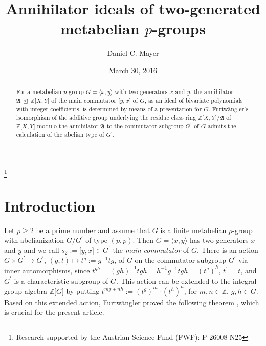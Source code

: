 \documentclass{amsart}
\theoremstyle{definition}
\numberwithin{equation}{section}
\begin{document}
\title{Annihilator ideals of two-generated metabelian \(p\)-groups}

\author{Daniel C. Mayer}
\address{Naglergasse 53\\8010 Graz\\Austria}
\thanks{Research supported by the Austrian Science Fund (FWF): P 26008-N25}


\date{March 30, 2016}


\begin{abstract}
For a metabelian \(p\)-group \(G=\langle x,y\rangle\) with two generators \(x\) and \(y\),
the annihilator \(\mathfrak{A}\,\unlhd\,\mathbb{Z}\lbrack X,Y\rbrack\)
of the main commutator \(\lbrack y,x\rbrack\) of \(G\),
as an ideal of bivariate polynomials with integer coefficients,
is determined by means of a presentation for \(G\).
Furtw\"angler's isomorphism of the additive group underlying the residue class ring
\(\mathbb{Z}\lbrack X,Y\rbrack/\mathfrak{A}\)
of \(\mathbb{Z}\lbrack X,Y\rbrack\) modulo the annihilator \(\mathfrak{A}\)
to the commutator subgroup \(G^\prime\) of \(G\)
admits the calculation of the abelian type of \(G^\prime\).
\end{abstract}

\maketitle



\section{Introduction}
\label{s:Intro}

\noindent
Let \(p\ge 2\) be a prime number
and assume that \(G\) is a finite metabelian \(p\)-group
with abelianization \(G/G^\prime\) of type \((p,p)\).
Then \(G=\langle x,y\rangle\) has two generators \(x\) and \(y\)
and we call \(s_2:=\lbrack y,x\rbrack\in G^\prime\)
the \textit{main commutator} of \(G\).
There is an action \(G\times G^\prime\to G^\prime\),
\((g,t)\mapsto t^g:=g^{-1}tg\),
of \(G\) on the commutator subgroup \(G^\prime\)
via inner automorphisms,
since \(t^{gh}=(gh)^{-1}tgh=h^{-1}g^{-1}tgh=(t^g)^h\), \(t^1=t\),
and \(G^\prime\) is a characteristic subgroup of \(G\).
This action can be extended to the integral group algebra
\(\mathbb{Z}\lbrack G\rbrack\)
by putting \(t^{mg+nh}:=(t^g)^m\cdot (t^h)^n\),
for \(m,n\in\mathbb{Z}\), \(g,h\in G\).
Based on this extended action,
Furtw\"angler proved the following theorem
\cite{Fw},
which is crucial for the present article.
\end{document}
